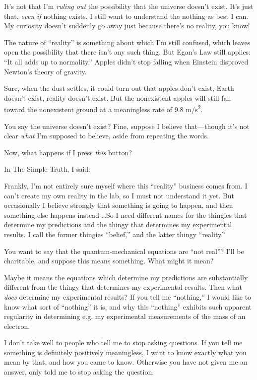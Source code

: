 {
 It's not that I'm \textit{ruling
out} the possibility that the universe doesn't exist.
It's just that, \textit{even} \textit{if} nothing
exists, I still want to understand the nothing as best I can. My
curiosity doesn't suddenly go away just because
there's no reality, you know!}

{
 The nature of ``reality'' is
something about which I'm still confused, which leaves
open the possibility that there isn't any such thing.
But Egan's Law still applies: ``It all
adds up to normality.'' Apples didn't
stop falling when Einstein disproved Newton's theory of
gravity.}

{
 Sure, when the dust settles, it could turn out that apples
don't exist, Earth doesn't exist,
reality doesn't exist. But the nonexistent apples will
still fall toward the nonexistent ground at a meaningless rate of 9.8
m/s\textsuperscript{2}.}

{
 You say the universe doesn't exist? Fine, suppose
I believe that---though it's not clear \textit{what}
I'm supposed to believe, aside from repeating the
words.}

{
 Now, what happens if I press \textit{this} button?}

{
 In The Simple Truth, I said:}

{
 Frankly, I'm not entirely sure myself where this
``reality'' business comes from. I
can't create my own reality in the lab, so I must not
understand it yet. But occasionally I believe strongly that something
is going to happen, and then something else happens instead \ldots So I
need different names for the thingies that determine my predictions and
the thingy that determines my experimental results. I call the former
thingies ``belief,'' and the latter
thingy ``reality.''}

{
 You want to say that the quantum-mechanical equations are
``not real''? I'll
be charitable, and suppose this means something. What might it mean?}

{
 Maybe it means the equations which determine my predictions are
substantially different from the thingy that determines my experimental
results. Then what \textit{does} determine my experimental results? If
you tell me ``nothing,'' I would
like to know what sort of
``nothing'' it is, and why this
``nothing'' exhibits such apparent
regularity in determining e.g. my experimental measurements of the mass
of an electron.}

{
 I don't take well to people who tell me to stop
asking questions. If you tell me something is definitely positively
meaningless, I want to know exactly what you mean by that, and how you
came to know. Otherwise you have not given me an answer, only told me
to stop asking the question.}

